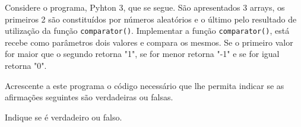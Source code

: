 \documentclass[12pt,varwidth=16cm,border=1pt]{standalone}
\begin{document}
Considere o programa, Pyhton 3, que se segue. São apresentados 3 arrays, os primeiros 2 são constituídos por números aleatórios e o último pelo resultado de utilização da função \verb+comparator()+. Implementar a função \verb+comparator()+, está recebe como parâmetros dois valores e compara os mesmos. Se o primeiro valor for maior que o segundo retorna "1", se for menor retorna "-1" e se for igual retorna "0".



Acrescente a este programa o código necessário que lhe permita indicar se as
afirmações seguintes são verdadeiras ou falsas.

Indique se é verdadeiro ou falso.
\end{document}

